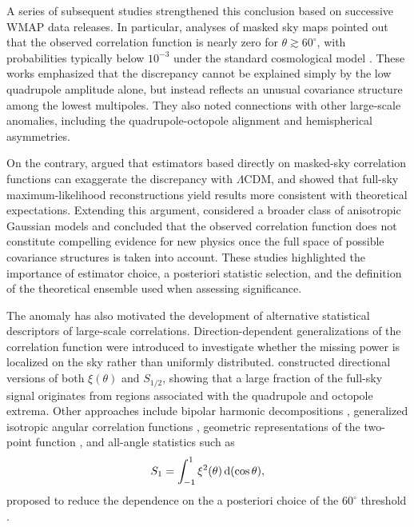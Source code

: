 \documentclass[apj,twocolumn,numberedappendix]{openjournal}
\newcommand{\dd}{\ensuremath{{\rm d}}}
\begin{document}
A series of subsequent studies strengthened this conclusion based on successive WMAP data releases.
In particular, analyses of masked sky maps pointed out that the observed correlation function is nearly zero for $\theta \gtrsim 60^\circ$, with probabilities typically below $10^{-3}$ under the standard cosmological model \citep{Copi2006Uncorrelated, Copi2009, Copi2013Lack}.
These works emphasized that the discrepancy cannot be explained simply by the low quadrupole amplitude alone, but instead reflects an unusual covariance structure among the lowest multipoles.
They also noted connections with other large-scale anomalies, including the quadrupole-octopole alignment and hemispherical asymmetries.

On the contrary, \citet{Efstathiou_2010} argued that estimators based directly on masked-sky correlation functions can exaggerate the discrepancy with $\Lambda$CDM, and showed that full-sky maximum-likelihood reconstructions yield results more consistent with theoretical expectations.
Extending this argument, \citet{Pontzen2010} considered a broader class of anisotropic Gaussian models and concluded that the observed correlation function does not constitute compelling evidence for new physics once the full space of possible covariance structures is taken into account.
These studies highlighted the importance of estimator choice, a posteriori statistic selection, and the definition of the theoretical ensemble used when assessing significance.

The anomaly has also motivated the development of alternative statistical descriptors of large-scale correlations.
Direction-dependent generalizations of the correlation function were introduced to investigate whether the missing power is localized on the sky rather than uniformly distributed.
\citet{Zhang2012} constructed directional versions of both $\xi(\theta)$ and $S_{1/2}$, showing that a large fraction of the full-sky signal originates from regions associated with the quadrupole and octopole extrema.
Other approaches include bipolar harmonic decompositions \citep{Joshi2009Bipolar},
generalized isotropic angular correlation functions \citep{2023Capturing}, geometric representations of the two-point function \citep{Froes2015New}, and all-angle statistics such as
\begin{equation}
S_1 = \int_{-1}^{1} \xi^2(\theta)\,\dd(\cos\theta),
\end{equation}
proposed to reduce the dependence on the a posteriori choice of the $60^\circ$ threshold \citep{Gruppuso2014}.
\end{document}

